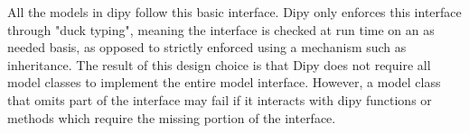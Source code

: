 All the models in dipy follow this basic interface. Dipy only enforces this interface through "duck typing", meaning the interface is checked at run time on an as needed basis, as opposed to strictly enforced using a mechanism such as inheritance. The result of this design choice is that Dipy does not require all model classes to implement the entire model interface. However, a model class that omits part of the interface may fail if it interacts with dipy functions or methods which require the missing portion of the interface.